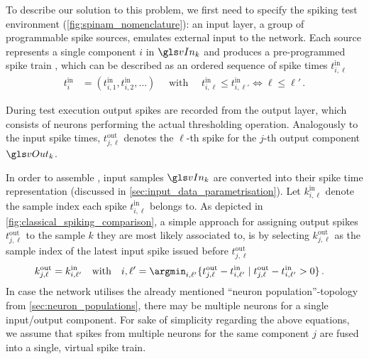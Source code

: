 To describe our solution to this problem, we first need to specify the spiking \BiNAM test environment (\cref{fig:spinam_nomenclature}): an input layer, a group of \dimIn programmable spike sources, emulates external input to the network. Each source represents a single component $i$ in \(\vIn_k\) and produces a pre-programmed spike train \tInI, which can be described as an ordered sequence of spike times \(t^{\mathrm{in}}_{i,\ell}\)
\begin{align}
	t^{\mathrm{in}}_i &= (
		t^{\mathrm{in}}_{i, 1},
		t^{\mathrm{in}}_{i, 2},
		\ldots) \quad
		    \text{ with } \quad t^{\mathrm{in}}_{i, \ell} \leq t^{\mathrm{in}}_{i, \ell'} \Leftrightarrow \ell \leq \ell' \,.
	\label{eqn:spike_train_nomenclature}
\end{align}

During test execution output spikes \tOutJ are recorded from the output layer, which consists of \dimOut neurons performing the actual thresholding operation. Analogously to the input spike times, \(t^{\mathrm{out}}_{j,\ell}\) denotes the $\ell$-th spike for the $j$-th output component \(\vOut_k\).

In order to assemble \tInI, input samples $\vIn_k$ are converted into their spike time representation (discussed in \cref{sec:input_data_parametrisation}). Let $k^{\mathrm{in}}_{i, \ell}$ denote the sample index each spike $t^{\mathrm{in}}_{i, \ell}$ belongs to. As depicted in \cref{fig:classical_spiking_comparison}, a simple approach for assigning output spikes \(t^{\mathrm{out}}_{j,\ell}\) to the sample $k$ they are most likely associated to, is by selecting $k^{\mathrm{out}}_{j, \ell}$ as the sample index of the latest input spike issued before \(t^{\mathrm{out}}_{j,\ell}\)
\begin{align}
	k^{\mathrm{out}}_{j, \ell} &= k^{\mathrm{in}}_{i, \ell'} \quad \text{with} \quad i, \ell' = \argmin_{i, \ell'}\{t^{\mathrm{out}}_{j,\ell} - t^{\mathrm{in}}_{i,\ell'} \mid t^{\mathrm{out}}_{j,\ell} - t^{\mathrm{in}}_{i,\ell'} > 0 \} \,.
	\label{eqn:spike_train_matching}
\end{align}
In case the network utilises the already mentioned \enquote{neuron population}-topology from \cref{sec:neuron_populations}, there may be multiple neurons for a single input/output component. For sake of simplicity regarding the above equations, we assume that spikes from multiple neurons for the same component $j$ are fused into a single, virtual spike train.

